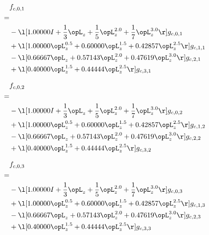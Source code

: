 \begin{alignat}{2} 
\label{eq:f_01_0} 
& f_{c,0,1} \nonumber \\ 
 = \\ 
& - \l[  1.00000 I + \frac{1}{3} \opL_z + \frac{1}{5} \opL_z^{2.0} + \frac{1}{7} \opL_z^{3.0}  \r] g_{c,0,1} \nonumber \\ 
& + \l[  1.00000 \opL_z^{0.5} +  0.60000 \opL_z^{1.5} +  0.42857 \opL_z^{2.5}  \r] g_{c,1,1} \nonumber \\ 
& - \l[  0.66667 \opL_z +  0.57143 \opL_z^{2.0} +  0.47619 \opL_z^{3.0}  \r] g_{c,2,1} \nonumber \\ 
& + \l[  0.40000 \opL_z^{1.5} +  0.44444 \opL_z^{2.5}  \r] g_{c,3,1} \nonumber \\ 
\end{alignat} 


\begin{alignat}{2} 
\label{eq:f_02_0} 
& f_{c,0,2} \nonumber \\ 
 = \\ 
& - \l[  1.00000 I + \frac{1}{3} \opL_z + \frac{1}{5} \opL_z^{2.0} + \frac{1}{7} \opL_z^{3.0}  \r] g_{c,0,2} \nonumber \\ 
& + \l[  1.00000 \opL_z^{0.5} +  0.60000 \opL_z^{1.5} +  0.42857 \opL_z^{2.5}  \r] g_{c,1,2} \nonumber \\ 
& - \l[  0.66667 \opL_z +  0.57143 \opL_z^{2.0} +  0.47619 \opL_z^{3.0}  \r] g_{c,2,2} \nonumber \\ 
& + \l[  0.40000 \opL_z^{1.5} +  0.44444 \opL_z^{2.5}  \r] g_{c,3,2} \nonumber \\ 
\end{alignat} 


\begin{alignat}{2} 
\label{eq:f_03_0} 
& f_{c,0,3} \nonumber \\ 
 = \\ 
& - \l[  1.00000 I + \frac{1}{3} \opL_z + \frac{1}{5} \opL_z^{2.0} + \frac{1}{7} \opL_z^{3.0}  \r] g_{c,0,3} \nonumber \\ 
& + \l[  1.00000 \opL_z^{0.5} +  0.60000 \opL_z^{1.5} +  0.42857 \opL_z^{2.5}  \r] g_{c,1,3} \nonumber \\ 
& - \l[  0.66667 \opL_z +  0.57143 \opL_z^{2.0} +  0.47619 \opL_z^{3.0}  \r] g_{c,2,3} \nonumber \\ 
& + \l[  0.40000 \opL_z^{1.5} +  0.44444 \opL_z^{2.5}  \r] g_{c,3,3} \nonumber \\ 
\end{alignat} 


